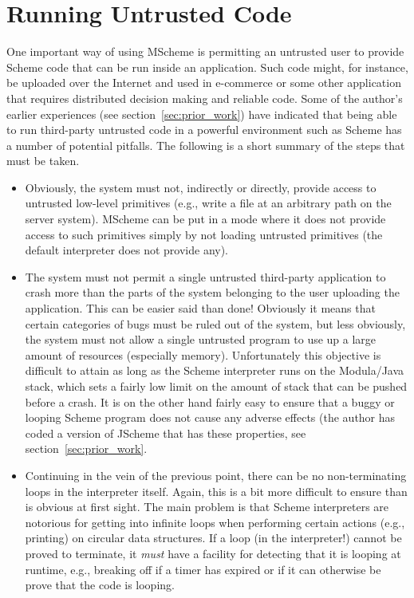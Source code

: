 \section{Running Untrusted Code}

One important way of using MScheme is permitting an untrusted user to
provide Scheme code that can be run inside an application.  Such code
might, for instance, be uploaded over the Internet and used in
e-commerce or some other application that requires distributed
decision making and reliable code.  Some of the author's earlier
experiences (see section~\ref{sec:prior_work}) have indicated that
being able to run third-party untrusted code in a powerful environment
such as Scheme has a number of potential pitfalls.  The following is
a short summary of the steps that must be taken.
\begin{itemize}

\item Obviously, the system must not, indirectly or directly, provide
  access to untrusted low-level primitives (e.g., write a file at an
  arbitrary path on the server system).  MScheme can be put in a mode
  where it does not provide access to such primitives simply by not
  loading untrusted primitives (the default interpreter does not provide
  any).

\item The system must not permit a single untrusted third-party
  application to crash more than the parts of the system belonging to
  the user uploading the application.  This can be easier said than
  done!  Obviously it means that certain categories of bugs must be
  ruled out of the system, but less obviously, the system must not
  allow a single untrusted program to use up a large amount of
  resources (especially memory).  Unfortunately this objective is
  difficult to attain as long as the Scheme interpreter runs on the
  Modula/Java stack, which sets a fairly low limit on the amount of
  stack that can be pushed before a crash.  It is on the other hand
  fairly easy to ensure that a buggy or looping Scheme program does not
  cause any adverse effects (the author has coded a version of JScheme
  that has these properties, see section~\ref{sec:prior_work}.

\item Continuing in the vein of the previous point, there can be no
  non-terminating loops in the interpreter itself.  Again, this is a
  bit more difficult to ensure than is obvious at first sight.  The
  main problem is that Scheme interpreters are notorious for getting
  into infinite loops when performing certain actions (e.g., printing)
  on circular data structures.  If a loop (in the interpreter!) cannot
  be proved to terminate, it {\em must\/} have a facility for
  detecting that it is looping at runtime, e.g., breaking off if a
  timer has expired or if it can otherwise be prove that the code is
  looping.


\end{itemize}
